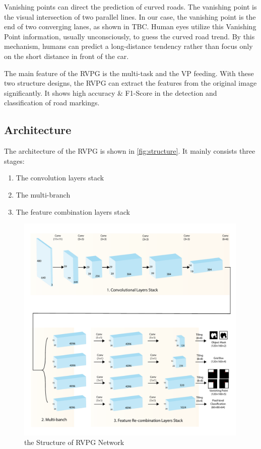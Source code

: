 \begin{spacing}{1.5}
Vanishing points can direct the prediction of curved roads. The vanishing point is the visual intersection of two parallel lines. In our case, the vanishing point is the end of two converging lanes, as shown in TBC. Human eyes utilize this Vanishing Point information, usually unconsciously, to guess the curved road trend. By this mechanism, humans can predict a long-distance tendency rather than focus only on the short distance in front of the car.

The main feature of the RVPG is the multi-task and the VP feeding. With these two structure designs, the RVPG can extract the features from the original image significantly. It shows high accuracy \& F1-Score in the detection and classification of road markings.

\subsection{Architecture}

The architecture of the RVPG is shown in \autoref{fig:structure}. It mainly consists three stages:

\begin{enumerate} \vspace{-5mm}
    \item The convolution layers stack
    \item The multi-branch
    \item The feature combination layers stack
\end{enumerate} \vspace{-5mm}

\begin{figure}[ht]
\centering
\includegraphics[width=0.99\textwidth, fbox]{Chapter3/structure.pdf}
\caption{the Structure of RVPG Network}
\label{fig:structure} 
\end{figure}


\end{spacing}
